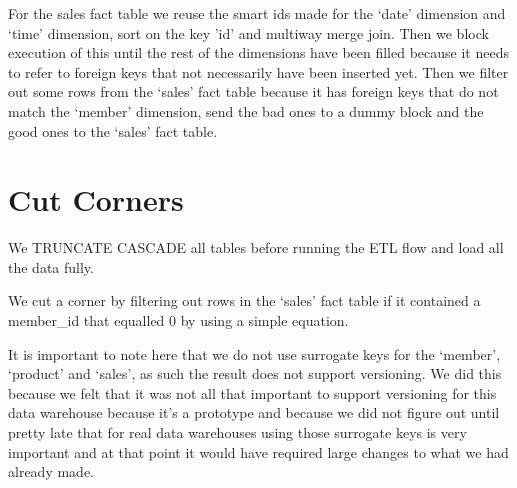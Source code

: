     For the sales fact table we reuse the smart ids made for the `date' dimension and `time' dimension, sort on the key 'id' and multiway merge join. Then we block execution of this until the rest of the dimensions have been filled because it needs to refer to foreign keys that not necessarily have been inserted yet. Then we filter out some rows from the `sales' fact table because it has foreign keys that do not match the `member' dimension, send the bad ones to a dummy block and the good ones to the `sales' fact table.
    
    \section{Cut Corners}
    We TRUNCATE CASCADE all tables before running the ETL flow and load all the data fully.
    
    We cut a corner by filtering out rows in the `sales' fact table if it contained a member\_id that equalled 0 by using a simple equation.
    
    It is important to note here that we do not use surrogate keys for the `member', `product' and `sales', as such the result does not support versioning. We did this because we felt that it was not all that important to support versioning for this data warehouse because it's a prototype and because we did not figure out until pretty late that for real data warehouses using those surrogate keys is very important and at that point it would have required large changes to what we had already made.


